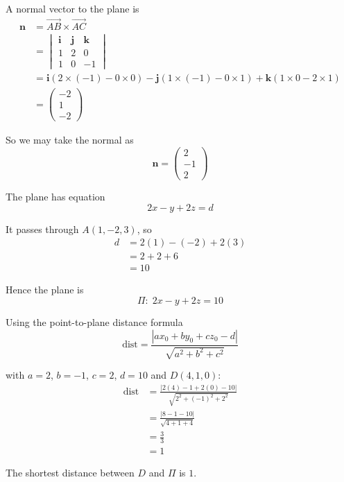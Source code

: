 \documentclass[leqno]{article}
\begin{document}
\begin{enumerate}[
  label=\textbf{\arabic*.},
  leftmargin=*,
  topsep=0pt,
  partopsep=0pt,
  parsep=0pt
]
\begin{djsSolution}
\begin{enumerate}[label=\textbf{(\alph*)}]
A normal vector to the plane is
\begin{align*}
\mathbf n
&=\overrightarrow{AB}\times \overrightarrow{AC} \\
&=
\begin{vmatrix}
\mathbf i & \mathbf j & \mathbf k\\
1&2&0\\
1&0&-1
\end{vmatrix} \\
&=\mathbf i(2\times(-1)-0\times 0)-\mathbf j(1\times(-1)-0\times 1)+\mathbf k(1\times 0-2\times 1) \\
&=\begin{pmatrix}-2\\1\\-2\end{pmatrix}
\end{align*}

So we may take the normal as
\[
\mathbf n=\begin{pmatrix}2\\-1\\2\end{pmatrix}
\]

The plane has equation
\[
2x-y+2z=d
\]

It passes through \(A(1,-2,3)\), so
\begin{align*}
d&=2(1)-(-2)+2(3)\\
&=2+2+6\\
&=10
\end{align*}

Hence the plane is
\[
\Pi:\;2x-y+2z=10
\]

Using the point-to-plane distance formula
\[
\mathrm{dist}
=\frac{\left\lvert ax_0+by_0+cz_0-d\right\rvert}{\sqrt{a^2+b^2+c^2}}
\]

with \(a=2\), \(b=-1\), \(c=2\), \(d=10\) and \(D(4,1,0)\):
\begin{align*}
\mathrm{dist}
&=\frac{\left\lvert 2(4)-1+2(0)-10\right\rvert}{\sqrt{2^2+(-1)^2+2^2}} \\
&=\frac{\left\lvert 8-1-10\right\rvert}{\sqrt{4+1+4}} \\
&=\frac{3}{3} \\
&=1
\end{align*}

The shortest distance between \(D\) and \(\Pi\) is \(1\).


\end{enumerate}
\end{djsSolution}
\end{enumerate}
\end{document}
